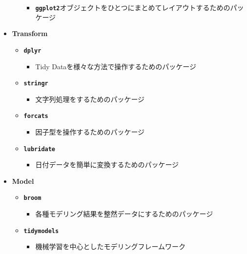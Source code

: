 \documentclass[
  12pt,
]{book}
\providecommand{\tightlist}{%
  \setlength{\itemsep}{0pt}\setlength{\parskip}{0pt}}
\begin{document}
\begin{itemize}
\begin{itemize}
    \begin{itemize}
    \tightlist
    \item
      \textbf{\texttt{ggplot2}}オブジェクトをひとつにまとめてレイアウトするためのパッケージ
    \end{itemize}
  \end{itemize}
\item
  \textbf{Transform}

  \begin{itemize}
  \tightlist
  \item
    \textbf{\texttt{dplyr}} \citep{R-dplyr} 

    \begin{itemize}
    \tightlist
    \item
      Tidy Dataを様々な方法で操作するためのパッケージ
    \end{itemize}
  \item
    \textbf{\texttt{stringr}} \citep{R-stringr} 

    \begin{itemize}
    \tightlist
    \item
      文字列処理をするためのパッケージ
    \end{itemize}
  \item
    \textbf{\texttt{forcats}} \citep{R-forcats} 

    \begin{itemize}
    \tightlist
    \item
      因子型を操作するためのパッケージ
    \end{itemize}
  \item
    \textbf{\texttt{lubridate}} \citep{R-lubridate} 

    \begin{itemize}
    \tightlist
    \item
      日付データを簡単に変換するためのパッケージ
    \end{itemize}
  \end{itemize}
\item
  \textbf{Model}

  \begin{itemize}
  \tightlist
  \item
    \textbf{\texttt{broom}} \citep{R-broom} 

    \begin{itemize}
    \tightlist
    \item
      各種モデリング結果を整然データにするためのパッケージ
    \end{itemize}
  \item
    \textbf{\texttt{tidymodels}}\citep{tidymodels2020, R-tidymodels} 

    \begin{itemize}
    \tightlist
    \item
      機械学習を中心としたモデリングフレームワーク
    \end{itemize}
  \end{itemize}
\end{itemize}
\end{document}

